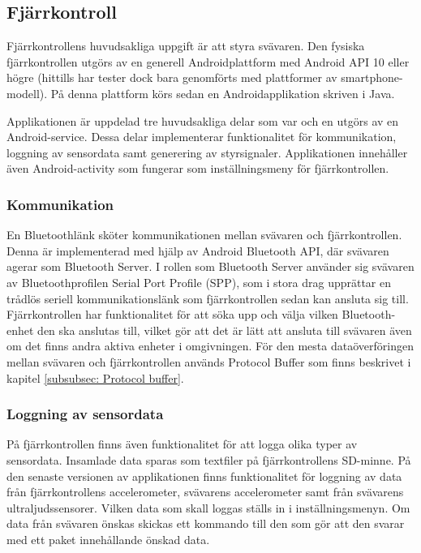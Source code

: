 \subsection{Fjärrkontroll}
Fjärrkontrollens huvudsakliga uppgift är att styra svävaren. Den fysiska fjärrkontrollen utgörs av en generell Androidplattform med Android API 10 eller högre (hittills har tester dock bara genomförts med plattformer av smartphone-modell). På denna plattform körs sedan en Androidapplikation skriven i Java. 

Applikationen är uppdelad tre huvudsakliga delar som var och en utgörs av en Android-service. Dessa delar implementerar funktionalitet för kommunikation, loggning av sensordata samt generering av styrsignaler. Applikationen innehåller även Android-activity som fungerar som inställningsmeny för fjärrkontrollen.

\subsubsection{Kommunikation}
En Bluetoothlänk sköter kommunikationen mellan svävaren och fjärrkontrollen.
Denna är implementerad med hjälp av Android Bluetooth API, där svävaren agerar
som Bluetooth Server. I rollen som Bluetooth Server använder sig svävaren av
Bluetoothprofilen Serial Port Profile (SPP), som i stora drag upprättar en
trådlös seriell kommunikationslänk som fjärrkontrollen sedan kan ansluta sig
till.
Fjärrkontrollen har funktionalitet för att söka upp och välja vilken
Bluetooth-enhet den ska anslutas till, vilket gör att det är lätt att ansluta
till svävaren även om det finns andra aktiva enheter i omgivningen.
För den mesta dataöverföringen mellan svävaren och fjärrkontrollen används
Protocol Buffer som finns beskrivet i kapitel \ref{subsubsec: Protocol buffer}.

\subsubsection{Loggning av sensordata}
På fjärrkontrollen finns även funktionalitet för att logga olika typer av sensordata. Insamlade data sparas som textfiler på fjärrkontrollens SD-minne. 
På den senaste versionen av applikationen finns funktionalitet för loggning av data från fjärrkontrollens accelerometer, svävarens accelerometer samt från svävarens ultraljudssensorer. Vilken data som skall loggas ställs in i inställningsmenyn. Om data från svävaren önskas skickas ett kommando till den som gör att den svarar med ett paket innehållande önskad data. 

